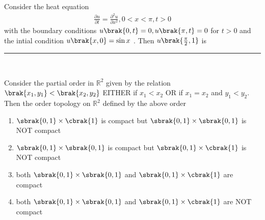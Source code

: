        \item Consider the heat equation 
       \begin{align}
           \frac{\partial u}{\partial t} = \frac{\partial ^2 u}{\partial x^2} , 0<x<\pi , t>0
       \end{align}
       with the boundary conditions $u\brak{0,t} = 0 , u\brak{\pi , t} = 0$ for $t>0$ and the intial condition $u\brak{x,0} = \sin{x}$ . Then $u\brak{\frac{\pi}{2},1}$ is \rule{3cm}{0.15mm}\\
       \item Consider the partial order in $\mathbb{R}^2$ given by the relation $\brak{x_1,y_1} < \brak{x_2,y_2}$ EITHER if $x_1 < x_2$ OR if $x_1 = x_2$ and $y_1 < y_2$. Then the order topology on $\mathbb{R}^2$ defined by the above order
       \begin{enumerate}
           \item $\sbrak{0,1} \times \cbrak{1}$ is compact but $\sbrak{0,1} \times \sbrak{0,1}$ is NOT compact
           \item $\sbrak{0,1} \times \sbrak{0,1}$ is compact but $\sbrak{0,1} \times \cbrak{1}$ is NOT compact
           \item both $\sbrak{0,1} \times \sbrak{0,1}$ and $\sbrak{0,1} \times \cbrak{1}$ are compact
           \item both $\sbrak{0,1} \times \sbrak{0,1}$ and $\sbrak{0,1} \times \cbrak{1}$ are NOT  compact
       \end{enumerate}
   
